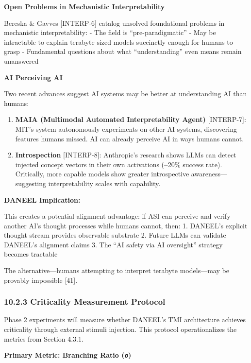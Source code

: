 \documentclass[
  11pt,
]{article}
\begin{document}
\textbf{Open Problems in Mechanistic Interpretability}

Bereska \& Gavves {[}INTERP-6{]} catalog unsolved foundational problems
in mechanistic interpretability: - The field is ``pre-paradigmatic'' -
May be intractable to explain terabyte-sized models succinctly enough
for humans to grasp - Fundamental questions about what ``understanding''
even means remain unanswered

\textbf{AI Perceiving AI}

Two recent advances suggest AI systems may be better at understanding AI
than humans:

\begin{enumerate}
\def\labelenumi{\arabic{enumi}.}
\item
  \textbf{MAIA (Multimodal Automated Interpretability Agent)}
  {[}INTERP-7{]}: MIT's system autonomously experiments on other AI
  systems, discovering features humans missed. AI can already perceive
  AI in ways humans cannot.
\item
  \textbf{Introspection} {[}INTERP-8{]}: Anthropic's research shows LLMs
  can detect injected concept vectors in their own activations
  (\textasciitilde20\% success rate). Critically, more capable models
  show greater introspective awareness---suggesting interpretability
  scales with capability.
\end{enumerate}

\textbf{DANEEL Implication:}

This creates a potential alignment advantage: if ASI can perceive and
verify another AI's thought processes while humans cannot, then: 1.
DANEEL's explicit thought stream provides observable substrate 2. Future
LLMs can validate DANEEL's alignment claims 3. The ``AI safety via AI
oversight'' strategy becomes tractable

The alternative---humans attempting to interpret terabyte models---may
be provably impossible {[}41{]}.

\subsubsection{10.2.3 Criticality Measurement
Protocol}\label{criticality-measurement-protocol}

Phase 2 experiments will measure whether DANEEL's TMI architecture
achieves criticality through external stimuli injection. This protocol
operationalizes the metrics from Section 4.3.1.

\textbf{Primary Metric: Branching Ratio (σ)}
\end{document}
